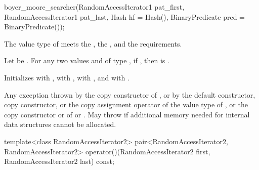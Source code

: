 %
\begin{itemdecl}
boyer_moore_searcher(RandomAccessIterator1 pat_first,
                     RandomAccessIterator1 pat_last,
                     Hash hf = Hash(),
                     BinaryPredicate pred = BinaryPredicate());
\end{itemdecl}

\begin{itemdescr}
\pnum
\expects
The value type of  meets
the ,
the , and
the  requirements.

\pnum
Let  be .
For any two values  and  of type ,
if , then  is .

\pnum
\effects
Initializes
 with ,
 with ,
 with , and
\mbox{} with .

\pnum
\throws
Any exception thrown by the copy constructor of ,
or by the default constructor, copy constructor, or the copy assignment operator of the value type of ,
or the copy constructor or  of  or .
May throw  if additional memory needed for internal data structures cannot be allocated.
\end{itemdescr}

%
\begin{itemdecl}
template<class RandomAccessIterator2>
  pair<RandomAccessIterator2, RandomAccessIterator2>
    operator()(RandomAccessIterator2 first, RandomAccessIterator2 last) const;
\end{itemdecl}

